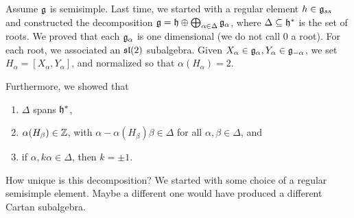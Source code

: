  \setcounter{lecture}{14}




 Assume $\g$ is semisimple. Last time, we started with a regular element $h\in
 \g_{ss}$ and constructed the decomposition $\g = \h\oplus \bigoplus_{\alpha \in
 \Delta} \g_\alpha$, where $\Delta\subseteq \h^*$ is the set of roots. We proved that
 each $\g_\alpha$ is one dimensional (we do not call 0 a root). For each root, we
 associated an $\sl(2)$ subalgebra. Given $X_\alpha \in \g_\alpha, Y_\alpha\in
 \g_{-\alpha}$, we set $H_\alpha = [X_\alpha,Y_\alpha]$, and normalized so that
 $\alpha(H_\alpha)=2$.

 Furthermore, we showed that
 \begin{enumerate}
 \item $\Delta$ spans $\h^*$,
 \item $\alpha (H_\beta)\in \ZZ$, with $\alpha
 - \alpha(H_\beta)\beta \in \Delta$ for all $\alpha, \beta \in \Delta$, and
 \item if $\alpha, k\alpha \in \Delta$, then $k=\pm 1$.
 \end{enumerate}

 How unique is this decomposition? We started with some choice of a regular semisimple
 element. Maybe a different one would have produced a different Cartan subalgebra.

